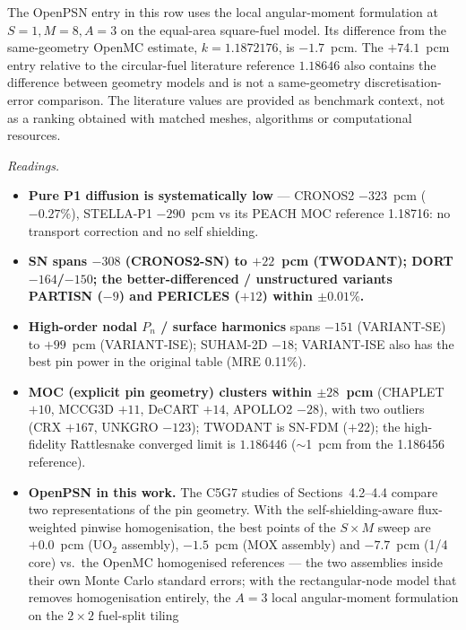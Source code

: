 \documentclass[11pt,a4paper]{article}
\begin{document}
\begin{table}[h]
\begin{minipage}{\linewidth}
\footnotesize The OpenPSN entry in this row uses the local
angular-moment formulation at $S{=}1,M{=}8,A{=}3$ on the equal-area
square-fuel model. Its difference from the same-geometry OpenMC
estimate, $k=1.1872176$, is $-1.7$~pcm. The $+74.1$~pcm entry relative
to the circular-fuel literature reference $1.18646$ also contains the
difference between geometry models and is not a same-geometry
discretisation-error comparison. The literature values are provided as
benchmark context, not as a ranking obtained with matched meshes,
algorithms or computational resources.
\end{minipage}

\end{table}

\emph{Readings.}
\begin{itemize}
\item \textbf{Pure P1 diffusion is systematically low} --- CRONOS2
  $-323$~pcm ($-0.27\%$), STELLA-P1
  $-290$~pcm vs its PEACH MOC reference 1.18716: no transport correction and
  no self shielding.
\item \textbf{SN spans $-308$ (CRONOS2-SN) to $+22$~pcm (TWODANT);
  DORT $-164$/$-150$; the better-differenced / unstructured variants
  PARTISN ($-9$) and PERICLES ($+12$) within $\pm0.01\%$.}
\item \textbf{High-order nodal $P_n$ / surface harmonics} spans
  $-151$ (VARIANT-SE) to $+99$~pcm (VARIANT-ISE); SUHAM-2D $-18$; VARIANT-ISE
  also has the best pin power in the original table (MRE 0.11\%).
\item \textbf{MOC (explicit pin geometry) clusters within $\pm28$~pcm}
  (CHAPLET $+10$, MCCG3D $+11$, DeCART $+14$, APOLLO2 $-28$), with two
  outliers (CRX $+167$, UNKGRO $-123$); TWODANT is SN-FDM ($+22$); the
  high-fidelity Rattlesnake converged limit is $1.186446$
  ($\sim$\SI{1}{pcm} from the 1.186456 reference).
\item \textbf{OpenPSN in this work.} The C5G7 studies of
Sections~4.2--4.4 compare two representations of the pin geometry. With the
  self-shielding-aware flux-weighted pinwise homogenisation, the best points of the
  $S\times M$ sweep are $+0.0$~pcm (UO$_2$ assembly), $-1.5$~pcm (MOX
  assembly) and $-7.7$~pcm (1/4 core) vs.\ the OpenMC homogenised
  references --- the two assemblies inside their own Monte Carlo standard
  errors; with the
  rectangular-node model that removes homogenisation entirely, the
  $A{=}3$ local angular-moment formulation on the $2\times2$ fuel-split tiling

\end{itemize}
\end{document}
